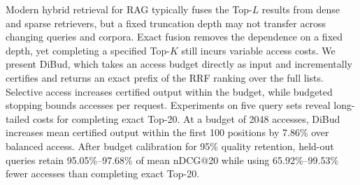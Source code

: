 Modern hybrid retrieval for RAG typically fuses the Top-\(L\) results from dense and sparse retrievers, but a fixed truncation depth may not transfer across changing queries and corpora. Exact fusion removes the dependence on a fixed depth, yet completing a specified Top-\(K\) still incurs variable access costs. We present DiBud, which takes an access budget directly as input and incrementally certifies and returns an exact prefix of the RRF ranking over the full lists. Selective access increases certified output within the budget, while budgeted stopping bounds accesses per request. Experiments on five query sets reveal long-tailed costs for completing exact Top-20. At a budget of 2048 accesses, DiBud increases mean certified output within the first 100 positions by 7.86\% over balanced access. After budget calibration for 95\% quality retention, held-out queries retain 95.05\%--97.68\% of mean nDCG@20 while using 65.92\%--99.53\% fewer accesses than completing exact Top-20.
